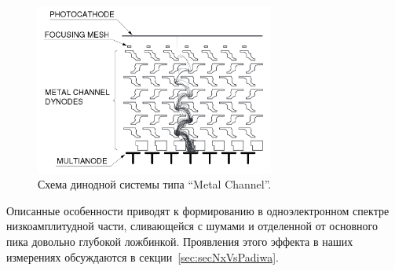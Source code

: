 \begin{figure}[H]
\centering
\includegraphics[width=0.7\textwidth]{pictures/2_Metal_channel.png}
\caption{Схема динодной системы типа ``Metal Channel''.}
\label{fig:MetalChannel}
\end{figure}

Описанные особенности приводят к формированию в одноэлектронном спектре низкоамплитудной части, сливающейся с шумами и отделенной от основного пика довольно глубокой ложбинкой. Проявления этого эффекта в наших измерениях обсуждаются в секции~\ref{sec:secNxVsPadiwa}.
